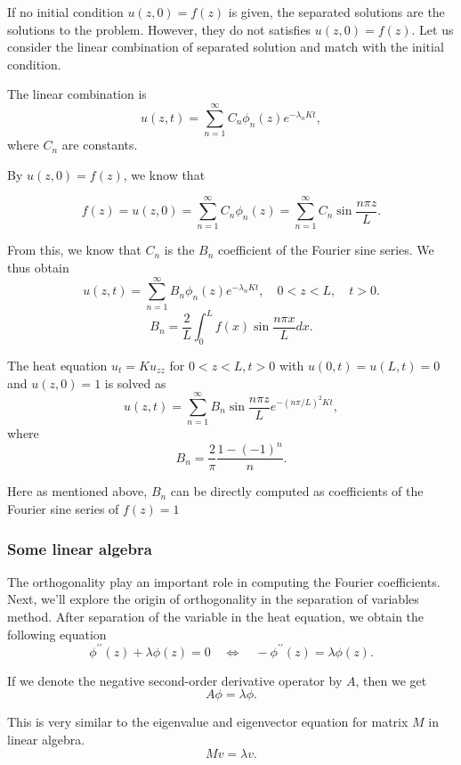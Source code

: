 If no initial condition $u(z, 0) = f(z)$ is given, the separated solutions are the solutions to the problem. However, they do not satisfies $u(z, 0) = f(z)$.
Let us consider the linear combination of separated solution and match with the initial condition.

The linear combination is 
$$
u(z, t)=\sum_{n=1}^{\infty} C_n \phi_n(z) e^{-\lambda_n K t},
$$
where $C_n$ are constants. 

By $u(z, 0) = f(z)$, we know that 

$$
f(z) = u(z, 0) = \sum_{n=1}^{\infty} C_n \phi_n(z) = \sum_{n=1}^{\infty} C_n \sin \frac{n\pi z}{L}.
$$

From this, we know that $C_n$ is the $B_n$ coefficient of the Fourier sine series. We thus obtain
$$
u(z, t)=\sum_{n=1}^{\infty} B_n \phi_n(z) e^{-\lambda_n K t}, \quad 0<z<L, \quad t>0 .
$$
$$
B_n=\frac{2}{L} \int_0^L f(x) \sin \frac{n \pi x}{L} d x.
$$

\begin{example}[]
The heat equation $u_t=K u_{z z}$ for $0<z<L, t>0$ with $u(0, t)=u(L, t)=0$ and $u(z, 0)=1$ is solved as
$$
u(z, t)=\sum_{n=1}^{\infty} B_n \sin \frac{n \pi z}{L} e^{-(n \pi / L)^2 K t},
$$
where  
$$
B_n=\frac{2}{\pi} \frac{1-(-1)^n}{n} .
$$

Here as mentioned above, $B_n$ can be directly computed as coefficients of the Fourier sine series of $f(z) = 1$
\end{example}

\subsubsection{Some linear algebra}

The orthogonality play an important role in computing the Fourier coefficients. Next, we'll explore the origin of orthogonality in the separation of variables method. After separation of the variable in the heat equation, we obtain the following equation
$$
\phi^{\prime \prime}(z)+\lambda \phi(z)=0 \quad \Leftrightarrow \quad -\phi^{\prime \prime}(z) = \lambda \phi(z).
$$

If we denote the negative second-order derivative operator by $A$, then we get
$$
A\phi = \lambda\phi.
$$ 

This is very similar to the eigenvalue and eigenvector equation for matrix $M$ in linear algebra.
\begin{equation}\label{eq.eigenvalue_linear_alg}
    M v = \lambda v.
\end{equation}

